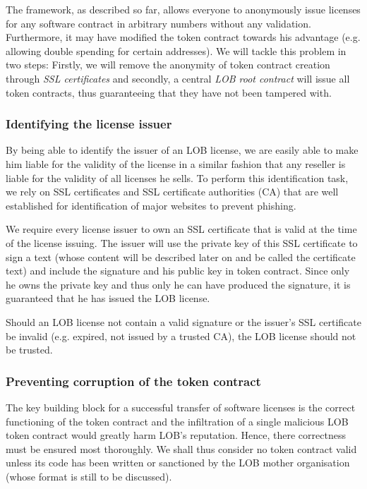 \documentclass[a4paper]{article}
\begin{document}
The framework, as described so far, allows everyone to anonymously issue licenses for any software contract in arbitrary numbers without any validation. Furthermore, it may have modified the token contract towards his advantage (e.g. allowing double spending for certain addresses). We will tackle this problem in two steps: Firstly, we will remove the anonymity of token contract creation through \emph{SSL certificates} and secondly, a central \emph{LOB root contract} will issue all token contracts, thus guaranteeing that they have not been tampered with.

\subsubsection{Identifying the license issuer}

By being able to identify the issuer of an LOB license, we are easily able to make him liable for the validity of the license in a similar fashion that any reseller is liable for the validity of all licenses he sells. To perform this identification task, we rely on SSL certificates and SSL certificate authorities (CA) that are well established for identification of major websites to prevent phishing.

We require every license issuer to own an SSL certificate that is valid at the time of the license issuing. The issuer will use the private key of this SSL certificate to sign a text (whose content will be described later on and be called the certificate text) and include the signature and his public key in token contract. Since only he owns the private key and thus only he can have produced the signature, it is guaranteed that he has issued the LOB license.

Should an LOB license not contain a valid signature or the issuer's SSL certificate be invalid (e.g. expired, not issued by a trusted CA), the LOB license should not be trusted.

\subsubsection{Preventing corruption of the token contract}

The key building block for a successful transfer of software licenses is the correct functioning of the token contract and the infiltration of a single malicious LOB token contract would greatly harm LOB's reputation. Hence, there correctness must be ensured most thoroughly. We shall thus consider no token contract valid unless its code has been written or sanctioned by the LOB mother organisation (whose format is still to be discussed).
\end{document}
